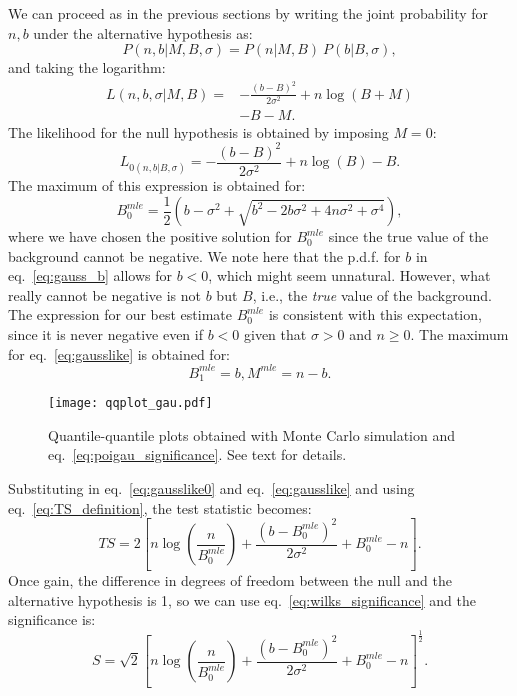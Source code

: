\documentclass[twocolumn]{aastex61}
\renewcommand{\textbf}{}
\begin{document}
We can proceed as in the previous sections by writing the joint probability for $n,b$ under the alternative hypothesis as:
$$
P(n,b|M,B,\sigma) = P(n|M,B)~P(b | B,\sigma),
$$
and taking the logarithm:
\begin{align}
L(n, b, \sigma | M, B) = & -\frac{(b-B)^2}{2 \sigma^2} + n \log{(B+M)} \nonumber \\
& - B - M.
\label{eq:gausslike}
\end{align}
The likelihood for the null hypothesis is obtained by imposing $M=0$:
\begin{equation}
L_{0(n, b | B, \sigma)} = -\frac{(b-B)^2}{2 \sigma^2} + n \log{(B)} - B.
\label{eq:gausslike0}
\end{equation}
The maximum of this expression is obtained for:
$$
B^{mle}_0 = \frac{1}{2} (b - \sigma^2 + \sqrt{b^2 - 2 b \sigma^2 + 4 n \sigma^2 + \sigma^4}),
$$
\textbf{where we have chosen the positive solution for $B^{mle}_{0}$ since the true value of the background cannot be negative.}
We note here that the p.d.f. for $b$ in eq.~\ref{eq:gauss_b} allows for $b<0$, which might seem unnatural. However, what really cannot be negative is not $b$ but $B$, i.e., the \textit{true} value of the background. The expression for our best estimate $B^{mle}_0$ is consistent with this expectation, since it is never negative even if $b<0$ given that $\sigma > 0$ and $n \ge 0$. 
The maximum for eq.~\ref{eq:gausslike} is obtained for:
$$
B^{mle}_1 = b, M^{mle} = n - b.
$$

\begin{figure*}[tb!]
\flushright
\texttt{[image: qqplot\_gau.pdf]}
\caption{Quantile-quantile plots obtained with Monte Carlo simulation and eq.~\ref{eq:poigau_significance}. See text for details.}
\label{fig:qqgau}
\end{figure*}

Substituting in eq.~\ref{eq:gausslike0} and eq.~\ref{eq:gausslike} and using eq.~\ref{eq:TS_definition}, the test statistic becomes:
$$
TS = 2 \left[ n \log{\left(\frac{n}{B^{mle}_{0}}\right)} + \frac{(b - B^{mle}_{0})^2}{2 
\sigma^2} + B^{mle}_{0} - n  \right].
$$
Once gain, the difference in degrees of freedom between the null and the alternative hypothesis is 1, so we can use eq.~\ref{eq:wilks_significance}
and the significance is:
\begin{equation}
S = \sqrt{2} \left[ n \log{\left(\frac{n}{B^{mle}_{0}}\right)} + \frac{(b - B^{mle}_{0})^2}{2 
\sigma^2} + B^{mle}_{0} - n  \right]^{\frac{1}{2}}.
\label{eq:poigau_significance}
\end{equation}
\end{document}

